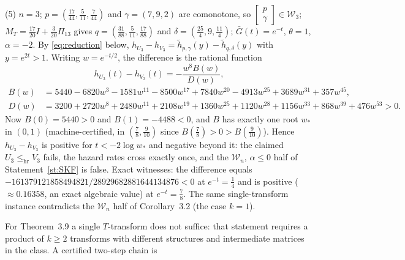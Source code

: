 \documentclass[10pt]{article}
\theoremstyle{plain}
\theoremstyle{definition}
\theoremstyle{remark}
\newcommand{\hr}{\mathrm{hr}}
\begin{document}
(5) $n=3$; $p=(\tfrac{17}{44},\tfrac5{11},\tfrac7{44})$ and $\gamma=(7,9,2)$ are comonotone, so $[\begin{smallmatrix}p\\ \gamma\end{smallmatrix}]\in\mathcal W_3$; $M_T=\tfrac{17}{20}I+\tfrac3{20}\Pi_{13}$ gives $q=(\tfrac{31}{88},\tfrac5{11},\tfrac{17}{88})$ and $\delta=(\tfrac{25}{4},9,\tfrac{11}{4})$; $\bar G(t)=e^{-t}$, $\theta=1$, $\alpha=-2$. By \eqref{eq:reduction} below, $h_{U_3}-h_{V_3}=\tilde h_{p,\gamma}(y)-\tilde h_{q,\delta}(y)$ with $y=e^{2t}>1$. Writing $w=e^{-t/2}$, the difference is the rational function
\begin{equation}\label{eq:whalf}
h_{U_3}(t)-h_{V_3}(t)=-\frac{w^{8}B(w)}{D(w)},
\end{equation}
\begin{align*}
B(w)&=5440-6820w^{3}-1581w^{11}-8500w^{17}+7840w^{20}-4913w^{25}+3689w^{31}+357w^{45},\\
D(w)&=3200+2720w^{8}+2480w^{11}+2108w^{19}+1360w^{25}+1120w^{28}+1156w^{33}+868w^{39}+476w^{53}>0.
\end{align*}
Now $B(0)=5440>0$ and $B(1)=-4488<0$, and $B$ has exactly one root $w_*$ in $(0,1)$ (machine-certified, in $(\tfrac78,\tfrac9{10})$ since $B(\tfrac78)>0>B(\tfrac9{10})$). Hence $h_{U_3}-h_{V_3}$ is positive for $t<-2\log w_*$ and negative beyond it: the claimed $U_3\le_{\hr}V_3$ fails, the hazard rates cross exactly once, and the $\mathcal W_n$, $\alpha\le0$ half of Statement~\ref{st:SKF} is false. Exact witnesses: the difference equals $-161379121858494821/28929682881644134876<0$ at $e^{-t}=\tfrac14$ and is positive ($\approx0.16358$, an exact algebraic value) at $e^{-t}=\tfrac78$. The same single-transform instance contradicts the $\mathcal W_n$ half of Corollary~3.2 (the case $k=1$).

For Theorem~3.9 a single $T$-transform does not suffice: that statement requires a product of $k\ge2$ transforms with different structures and intermediate matrices in the class. A certified two-step chain is
\end{document}
